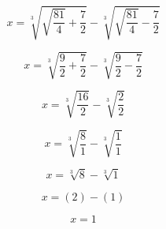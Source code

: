 \documentclass[11pt]{article}
\begin{document}
	\begin{center}
		\begin{large}
		$$
		  x = \sqrt[3]{\sqrt{\frac{81}{4}} + \frac{7}{2}} 
		    - \sqrt[3]{\sqrt{\frac{81}{4}} - \frac{7}{2}}
		$$
		
		$$
		  x = \sqrt[3]{\frac{9}{2} + \frac{7}{2}} 
		    - \sqrt[3]{\frac{9}{2} - \frac{7}{2}}
		$$
		
		$$
		  x = \sqrt[3]{\frac{16}{2}} 
		    - \sqrt[3]{\frac{2}{2}}
		$$		
		
		$$
		  x = \sqrt[3]{\frac{8}{1}} 
		    - \sqrt[3]{\frac{1}{1}}
		$$
		
		$$
		  x = \sqrt[3]{8} 
		    - \sqrt[3]{1}
		$$
		
		$$
		  x = (2) 
		    - (1)
		$$
		
		$$
		  x = 1
		$$
		\end{large}
	\end{center}
	
\end{document}
